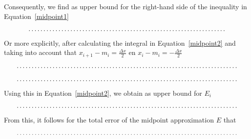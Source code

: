 \begin{Exercise}
Consequently, we find as upper bound for the right-hand side of the inequality in Equation~\eqref{midpoint1}
\vspace*{1cm}
\begin{equation}
\dotrule{0.85\textwidth}%
\label{midpoint2}
\end{equation}
Or more explicitly, after calculating the integral in Equation~\eqref{midpoint2} and taking into account that $x_{i+1}-m_i=\frac{\Delta x}{2}$ en $x_{i}-m_i=-\frac{\Delta x}{2}$
\vspace*{1cm}
$$
\dotrule{0.95\textwidth}%
$$
\vspace*{1cm}
$$
\dotrule{0.95\textwidth}%
$$
Using this in Equation~\eqref{midpoint2}, we obtain as upper bound for $E_i$
\vspace*{1cm}
$$
\dotrule{0.95\textwidth}%
$$
From this, it follows for the total error of the midpoint approximation $E$ that
\vspace*{1cm}
$$
\dotrule{0.95\textwidth}%
$$
\end{Exercise}

